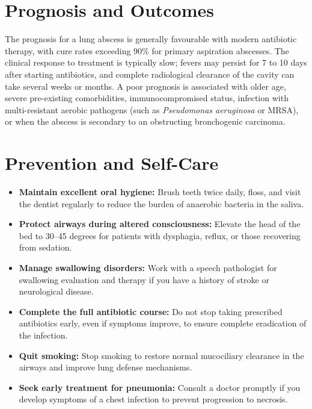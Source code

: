 \section*{Prognosis and Outcomes}
The prognosis for a lung abscess is generally favourable with modern antibiotic therapy, with cure rates exceeding 90\% for primary aspiration abscesses. The clinical response to treatment is typically slow; fevers may persist for 7 to 10 days after starting antibiotics, and complete radiological clearance of the cavity can take several weeks or months. A poor prognosis is associated with older age, severe pre-existing comorbidities, immunocompromised status, infection with multi-resistant aerobic pathogens (such as \textit{Pseudomonas aeruginosa} or MRSA), or when the abscess is secondary to an obstructing bronchogenic carcinoma.

\section*{Prevention and Self-Care}
\begin{itemize}
    \item \textbf{Maintain excellent oral hygiene:} Brush teeth twice daily, floss, and visit the dentist regularly to reduce the burden of anaerobic bacteria in the saliva.
    \item \textbf{Protect airways during altered consciousness:} Elevate the head of the bed to 30--45 degrees for patients with dysphagia, reflux, or those recovering from sedation.
    \item \textbf{Manage swallowing disorders:} Work with a speech pathologist for swallowing evaluation and therapy if you have a history of stroke or neurological disease.
    \item \textbf{Complete the full antibiotic course:} Do not stop taking prescribed antibiotics early, even if symptoms improve, to ensure complete eradication of the infection.
    \item \textbf{Quit smoking:} Stop smoking to restore normal mucociliary clearance in the airways and improve lung defense mechanisms.
    \item \textbf{Seek early treatment for pneumonia:} Consult a doctor promptly if you develop symptoms of a chest infection to prevent progression to necrosis.
\end{itemize}

